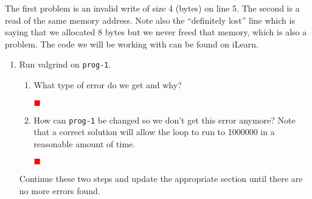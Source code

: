 \documentclass[12pt]{article}
\newcounter{problem}
\newenvironment{solution}{\par\textcolor{green!50!black}\bgroup}{\egroup\par}
\newcommand{\TODO}{\textcolor{red}{$\blacksquare$}}
\begin{document}
The first problem is an invalid write of size 4 (bytes) on line 5. The second is
a read of the same memory address. Note also the ``definitely lost'' line which
is saying that we allocated 8 bytes but we never freed that memory, which is also
a problem.  The code we will be working with can be found on iLearn.

\begin{enumerate}
\item Run valgrind on \texttt{prog-1}.
\begin{enumerate}
\item What type of error do we get and why?
  \begin{solution}
  \textbf{\textcolor{red}{\TODO}}
  \end{solution}
\item How can \texttt{prog-1} be changed so we don't get this error anymore?
  Note that a correct solution will allow the loop to run to 1000000 in a
  reasonable amount of time.
  \begin{solution}
  \textbf{\textcolor{red}{\TODO}}
  \end{solution}
\end{enumerate}
Continue these two steps and update the appropriate section until there are no more errors found.


\end{enumerate}
\end{document}
